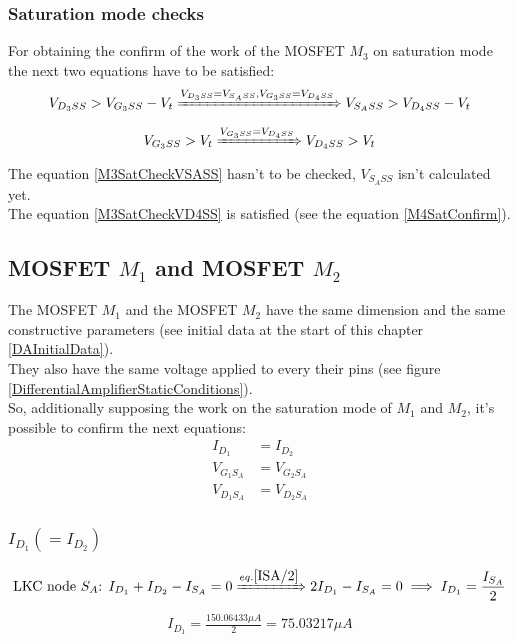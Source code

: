 \subsubsection{Saturation mode checks}
For obtaining the confirm of the work of the MOSFET $M_3$ on saturation mode the next two equations have to be satisfied:\\
\begin{align}
V_{{D_3}SS} > V_{{G_3}SS} - V_t \xRightarrow{V_{{D_3}SS} = V_{S_ASS}, V_{{G_3}SS} = V_{{D_4}SS}} V_{{S_A}SS} > V_{{D_4}SS} - V_t \label{M3SatCheckVSASS}
\end{align}
\begin{align}
V_{{G_3}SS} > V_t \xRightarrow{V_{{G_3}SS} = V_{{D_4}SS}} V_{{D_4}SS} > V_t \label{M3SatCheckVD4SS}
\end{align}
The equation \ref{M3SatCheckVSASS} hasn't to be checked, $V_{S_ASS}$ isn't calculated yet.\\
The equation \ref{M3SatCheckVD4SS} is satisfied (see the equation \ref{M4SatConfirm}).\par

\subsection{MOSFET $M_1$ and MOSFET $M_2$}
The MOSFET $M_1$ and the MOSFET $M_2$ have the same dimension and the same constructive parameters (see initial data at the start of this chapter \ref{DAInitialData}).\\
They also have the same voltage applied to every their pins (see figure \ref{DifferentialAmplifierStaticConditions}).\\
So, additionally supposing the work on the saturation mode of $M_1$ and $M_2$, it's possible to confirm the next equations:\\
\begin{align}
I_{D_1} &= I_{D_2}\label{ISA/2}\\
V_{G_1S_A} &= V_{G_2S_A}\\
V_{D_1S_A} &= V_{D_2S_A}
\end{align}

\subsubsection{$I_{D_1} (= I_{D_2})$}
\begin{align}
\text{LKC node } S_A \text{: } I_{D_1} + I_{D_2} - I_{S_A} = 0 \xRightarrow{eq. \ref{ISA/2}} 2I_{D_1} - I_{S_A} = 0 \implies I_{D_1} = \frac{I_{S_A}}{2}
\end{align}
\begin{align}
I_{D_1} = \frac{150.06433 \mu A}{2} = 75.03217 \mu A
\end{align}

